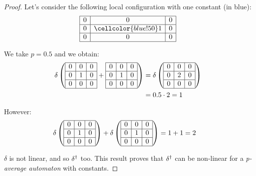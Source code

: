  \begin{proof}
   Let's consider the following local configuration with one constant (in blue):
   \[\begin{array}{ | c | c | c |} \hline
    0 & 0 & 0 \\ \hline
    0 & \cellcolor{blue!50} 1 & 0 \\ \hline
    0 & 0 & 0 \\ \hline
  \end{array}\]
  
  We take $p=0.5$ and we obtain:
 \[\begin{split}
 \delta \left(\begin{array}{ | c | c | c |} \hline
  0 & 0 & 0 \\ \hline
  0 & 1 & 0 \\ \hline
  0 & 0 & 0 \\ \hline
 \end{array} + \begin{array}{ | c | c | c |} \hline
  0 & 0 & 0 \\ \hline
  0 & 1 & 0 \\ \hline
  0 & 0 & 0 \\ \hline
 \end{array} \right) & = \delta \left(\begin{array}{ | c | c | c |} \hline
  0 & 0 & 0 \\ \hline
  0 & 2 & 0 \\ \hline
  0 & 0 & 0 \\ \hline
 \end{array} \right) \\
		     & = 0.5 \cdot 2 = 1    
 \end{split}\]  
  
  However:
 \[\begin{split}
 \delta \left(\begin{array}{ | c | c | c |} \hline
  0 & 0 & 0 \\ \hline
  0 & 1 & 0 \\ \hline
  0 & 0 & 0 \\ \hline
 \end{array}\right) + \delta \left(\begin{array}{ | c | c | c |} \hline
  0 & 0 & 0 \\ \hline
  0 & 1 & 0 \\ \hline
  0 & 0 & 0 \\ \hline
 \end{array} \right) & = 1 + 1 = 2
 \end{split}\]  
  
 $\delta$ is not linear, and so $\delta^{\dag}$ too. This result proves that $\delta^{\dag}$ can be non-linear for a \textit{p-average automaton} with constants.
 \end{proof}

